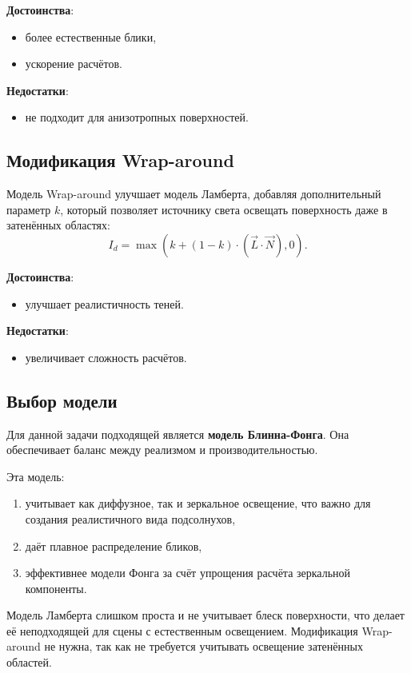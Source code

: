 \textbf{Достоинства}:
\begin{itemize}
    \item более естественные блики,
    \item ускорение расчётов.
\end{itemize}

\textbf{Недостатки}:
\begin{itemize}
    \item не подходит для анизотропных поверхностей.
\end{itemize}

\subsection{Модификация Wrap-around}

Модель Wrap-around улучшает модель Ламберта, добавляя дополнительный параметр \( k \), который позволяет источнику света освещать поверхность даже в затенённых областях:
\[
I_d = \max(k + (1 - k) \cdot (\vec{L} \cdot \vec{N}), 0).
\]

\textbf{Достоинства}:
\begin{itemize}
    \item улучшает реалистичность теней.
\end{itemize}

\textbf{Недостатки}:
\begin{itemize}
    \item увеличивает сложность расчётов.
\end{itemize}

\subsection{Выбор модели}

Для данной задачи подходящей является \textbf{модель Блинна-Фонга}. Она обеспечивает баланс между реализмом и производительностью. 

Эта модель:
\begin{enumerate}
    \item учитывает как диффузное, так и зеркальное освещение, что важно для создания реалистичного вида подсолнухов,
    \item даёт плавное распределение бликов,
    \item эффективнее модели Фонга за счёт упрощения расчёта зеркальной компоненты.
\end{enumerate}

Модель Ламберта слишком проста и не учитывает блеск поверхности, что делает её неподходящей для сцены с естественным освещением. Модификация Wrap-around не нужна, так как не требуется учитывать освещение затенённых областей.

